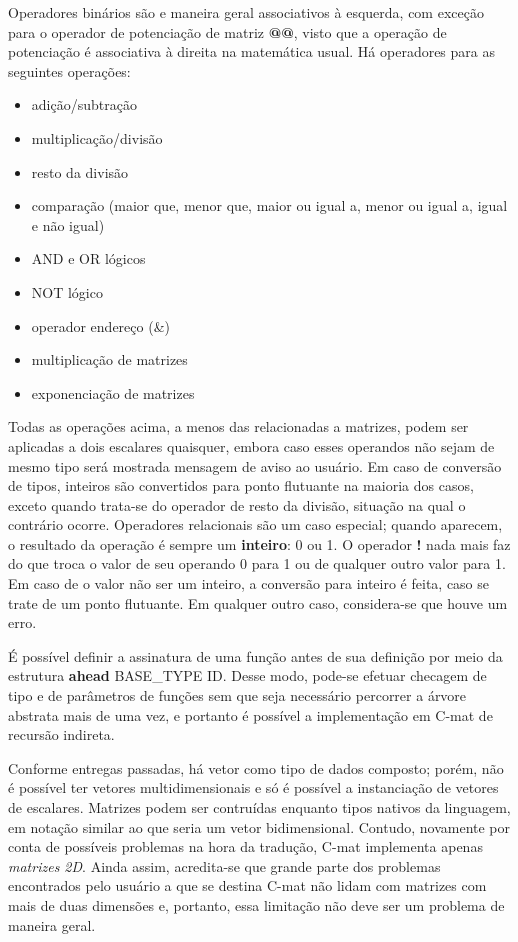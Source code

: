 \documentclass[
	article,			%
	11pt,				%
	oneside,			%
	a4paper,			%
	english,			%
	brazil,				%
	sumario=tradicional
	]{abntex2}
\renewcommand{\it}[1]{\textit{#1}}
\renewcommand{\bf}[1]{\textbf{#1}}
\begin{document}
Operadores binários são e maneira geral associativos à esquerda, com exceção para o operador de potenciação de matriz \bf{@@}, visto que a operação de potenciação é associativa à direita na matemática usual. Há operadores para as seguintes operações:
\begin{itemize}
	\item adição/subtração
	\item multiplicação/divisão
	\item resto da divisão
	\item comparação (maior que, menor que, maior ou igual a, menor ou igual a, igual e não igual)
	\item AND e OR lógicos
	\item NOT lógico
	\item operador endereço (\&)
	\item multiplicação de matrizes
	\item exponenciação de matrizes
\end{itemize}

Todas as operações acima, a menos das relacionadas a matrizes, podem ser aplicadas a dois escalares quaisquer, embora caso esses operandos não sejam de mesmo tipo será mostrada mensagem de aviso ao usuário. Em caso de conversão de tipos, inteiros são convertidos para ponto flutuante na maioria dos casos, exceto quando trata-se do operador de resto da divisão, situação na qual o contrário ocorre. Operadores relacionais são um caso especial; quando aparecem, o resultado da operação é sempre um \bf{inteiro}: 0 ou 1. O operador \bf{!} nada mais faz do que troca o valor de seu operando 0 para 1 ou de qualquer outro valor para 1. Em caso de o valor não ser um inteiro, a conversão para inteiro é feita, caso se trate de um ponto flutuante. Em qualquer outro caso, considera-se que houve um erro.

É possível definir a assinatura de uma função antes de sua definição por meio da estrutura \bf{ahead} BASE\_TYPE ID. Desse modo, pode-se efetuar checagem de tipo e de parâmetros de funções sem que seja necessário percorrer a árvore abstrata mais de uma vez, e portanto é possível a implementação em C-mat de recursão indireta.

Conforme entregas passadas, há vetor como tipo de dados composto; porém, não é possível ter vetores multidimensionais e só é possível a instanciação de vetores de escalares. Matrizes podem ser contruídas enquanto tipos nativos da linguagem, em notação similar ao que seria um vetor bidimensional. Contudo, novamente por conta de possíveis problemas na hora da tradução, C-mat implementa apenas \it{matrizes 2D}. Ainda assim, acredita-se que grande parte dos problemas encontrados pelo usuário a que se destina C-mat não lidam com matrizes com mais de duas dimensões e, portanto, essa limitação não deve ser um problema de maneira geral.
\end{document}
